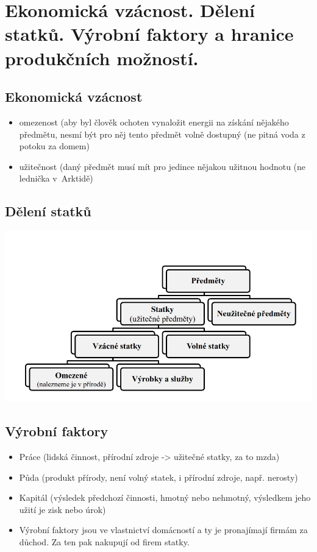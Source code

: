 \clearpage
\section{Ekonomická vzácnost. Dělení statků. Výrobní faktory a hranice produkčních možností.}

\subsection{Ekonomická vzácnost}
\begin{itemize}
    \item omezenost (aby byl člověk ochoten vynaložit energii na získání nějakého předmětu,
    nesmí být pro něj tento předmět volně dostupný (ne pitná voda z potoku za domem)
    \item užitečnost (daný předmět musí mít pro jedince nějakou užitnou hodnotu (ne lednička
    v~Arktidě)
\end{itemize}

\subsection{Dělení statků}
\includegraphics[width=16cm]{images/02_deleni.png}

\subsection{Výrobní faktory}
\begin{itemize}
    \item Práce (lidská činnost, přírodní zdroje -> užitečné statky, za to mzda)
    \item Půda (produkt přírody, není volný statek, i přírodní zdroje, např. nerosty)
    \item Kapitál (výsledek předchozí činnosti, hmotný nebo nehmotný, výsledkem jeho užití je zisk nebo úrok)
    \item Výrobní faktory jsou ve vlastnictví domácností a ty je pronajímají firmám za důchod. Za ten pak
    nakupují od firem statky.
\end{itemize}

